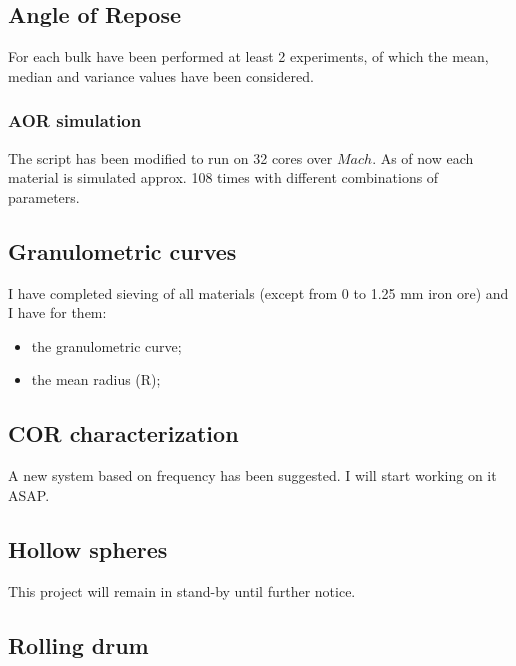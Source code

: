 \subsection{Angle of Repose}
\label{subsection:aor}

For each bulk have been performed at least 2 experiments, of which the mean, median and variance values have been considered.\\

\subsubsection{AOR simulation}
\label{subsubsection:aorsimulation}

The script has been modified to run on 32 cores over $Mach$. As of now each material is simulated approx. 108 times with different combinations of parameters.\\

\subsection{Granulometric curves}
\label{subsection:granulometric curves}

I have completed sieving of all materials (except from 0 to 1.25 mm iron ore) and I have for them:
\begin{itemize}
\item{the granulometric curve;}
\item{the mean radius (R);}
\end{itemize}

\subsection{COR characterization}
\label{subsection:corcharacterization}

A new system based on frequency has been suggested. I will start working on it ASAP.

\subsection{Hollow spheres}
\label{subsection:hollowspheres}

This project will remain in stand-by until further notice.

\subsection{Rolling drum}
\label{subsection:rolling drum}

